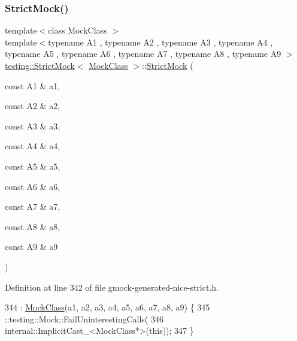 \subsubsection{\texorpdfstring{Strict\+Mock()}{StrictMock()}\hspace{0.1cm}{\footnotesize\ttfamily [10/11]}}
{\footnotesize\ttfamily template$<$class Mock\+Class $>$ \\
template$<$typename A1 , typename A2 , typename A3 , typename A4 , typename A5 , typename A6 , typename A7 , typename A8 , typename A9 $>$ \\
\hyperlink{classtesting_1_1StrictMock}{testing\+::\+Strict\+Mock}$<$ \hyperlink{classMockClass}{Mock\+Class} $>$\+::\hyperlink{classtesting_1_1StrictMock}{Strict\+Mock} (\begin{DoxyParamCaption}\item[{const A1 \&}]{a1,  }\item[{const A2 \&}]{a2,  }\item[{const A3 \&}]{a3,  }\item[{const A4 \&}]{a4,  }\item[{const A5 \&}]{a5,  }\item[{const A6 \&}]{a6,  }\item[{const A7 \&}]{a7,  }\item[{const A8 \&}]{a8,  }\item[{const A9 \&}]{a9 }\end{DoxyParamCaption})\hspace{0.3cm}{\ttfamily [inline]}}



Definition at line 342 of file gmock-\/generated-\/nice-\/strict.\+h.


\begin{DoxyCode}
344                     : \hyperlink{classMockClass}{MockClass}(a1, a2, a3, a4, a5, a6, a7, a8, a9) \{
345     ::testing::Mock::FailUninterestingCalls(
346         internal::ImplicitCast\_<MockClass*>(\textcolor{keyword}{this}));
347   \}
\end{DoxyCode}
\mbox{\label{classtesting_1_1StrictMock_a4936b0a5622b39e974deae12ecb1430b}} 
